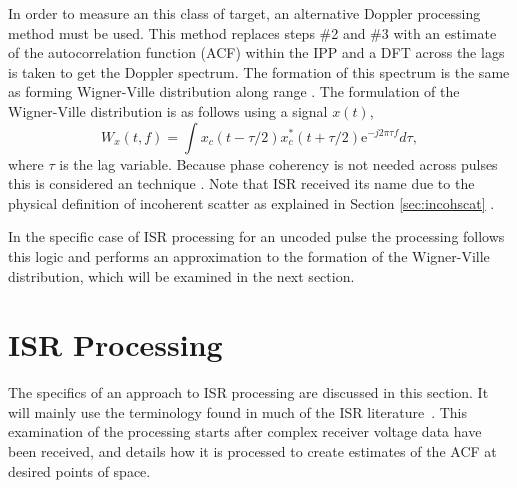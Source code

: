 In order to measure an this class of target, an alternative Doppler processing method must be used. This method replaces steps \#2 and \#3 with an estimate of the autocorrelation function (ACF) within the IPP and a DFT across the lags is taken to get the Doppler spectrum.
The formation of this spectrum is the same as forming Wigner-Ville distribution along range \citep{TFAcohen}. The formulation of the Wigner-Ville distribution is as follows using a signal $x(t)$,
\begin{equation}
\label{eqn:wigdist}
W_x(t,f)=\int x_c(t-\tau/2)x_c^*(t+\tau/2)\text{e}^{-j2\pi \tau f}d\tau,
\end{equation}
where $\tau$ is the lag variable. Because phase coherency is not needed across pulses this is considered an  technique \citep{richards2014fundamentals,richards2010principles,richards2014principles,skolnik2008radar}. 
Note that ISR received its name due to the physical definition of incoherent scatter as explained in Section \ref{sec:incohscat} \citep{gordon58,dougherty:farley1960}.


In the specific case of ISR processing for an uncoded pulse the processing follows this logic and performs an approximation to the formation of the Wigner-Ville distribution, which will be examined in the next section. 


\section{ISR Processing}\label{section:isrproc}
The specifics of an approach to ISR processing are discussed in this section. It will mainly use the terminology found in much of the ISR literature~\citep{farley1969,nygren1996}. This examination of the processing starts after complex receiver voltage data have been received, and details how it is processed to create estimates of the ACF at desired points of space.

